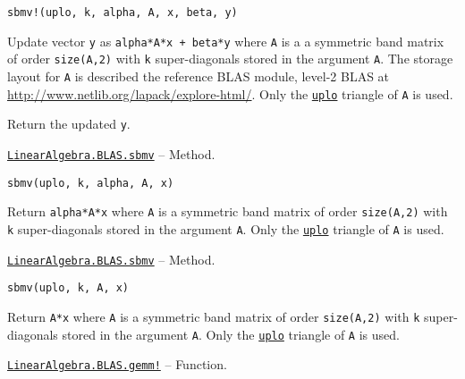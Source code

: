 \begin{adjustwidth}{2em}{0pt}


\begin{verbatim}
sbmv!(uplo, k, alpha, A, x, beta, y)
\end{verbatim}

Update vector \texttt{y} as \texttt{alpha*A*x + beta*y} where \texttt{A} is a a symmetric band matrix of order \texttt{size(A,2)} with \texttt{k} super-diagonals stored in the argument \texttt{A}. The storage layout for \texttt{A} is described the reference BLAS module, level-2 BLAS at \href{http://www.netlib.org/lapack/explore-html/}{http://www.netlib.org/lapack/explore-html/}. Only the \hyperlink{13880289478825450693}{\texttt{uplo}} triangle of \texttt{A} is used.

Return the updated \texttt{y}.



\end{adjustwidth}
\hypertarget{17387012353031396238}{} 
\hyperlink{17387012353031396238}{\texttt{LinearAlgebra.BLAS.sbmv}}  -- {Method.}

\begin{adjustwidth}{2em}{0pt}


\begin{verbatim}
sbmv(uplo, k, alpha, A, x)
\end{verbatim}

Return \texttt{alpha*A*x} where \texttt{A} is a symmetric band matrix of order \texttt{size(A,2)} with \texttt{k} super-diagonals stored in the argument \texttt{A}. Only the \hyperlink{13880289478825450693}{\texttt{uplo}} triangle of \texttt{A} is used.



\end{adjustwidth}
\hypertarget{7451827779071390643}{} 
\hyperlink{7451827779071390643}{\texttt{LinearAlgebra.BLAS.sbmv}}  -- {Method.}

\begin{adjustwidth}{2em}{0pt}


\begin{verbatim}
sbmv(uplo, k, A, x)
\end{verbatim}

Return \texttt{A*x} where \texttt{A} is a symmetric band matrix of order \texttt{size(A,2)} with \texttt{k} super-diagonals stored in the argument \texttt{A}. Only the \hyperlink{13880289478825450693}{\texttt{uplo}} triangle of \texttt{A} is used.



\end{adjustwidth}
\hypertarget{8173170876588438683}{} 
\hyperlink{8173170876588438683}{\texttt{LinearAlgebra.BLAS.gemm!}}  -- {Function.}

